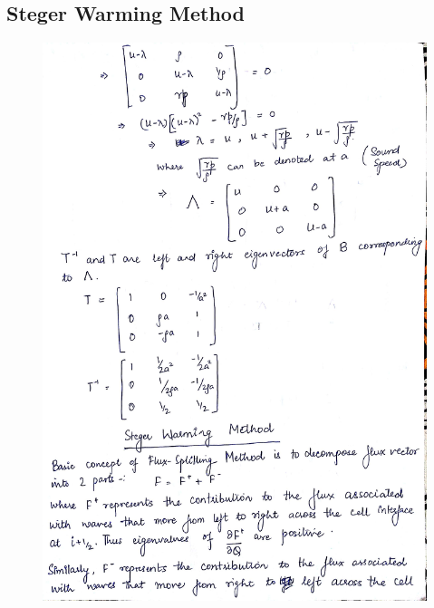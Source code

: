 \documentclass{article}
\begin{document}
\subsection*{Steger Warming Method}
\begin{figure}[H]   \label{figure}
\includegraphics[width=15cm]{four.jpg}
\label{figure:}
\end{figure}
\newpage
\end{document}
